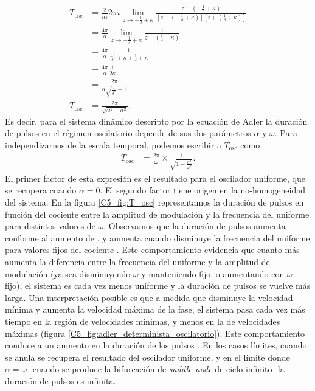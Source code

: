 \documentclass[./main.tex]{subfiles}
\begin{document}
\begin{align}
   T_{\text{osc}} &= \frac{2}{i\alpha} 2\pi i \lim_{z \to -\frac{1}{\delta} + \kappa} \frac{z-(-\frac{1}{\delta} + \kappa)}{[z-(-\frac{1}{\delta} + \kappa)][z + (\frac{1}{\delta} + \kappa)] } \nonumber\\
    &= \frac{4\pi}{\alpha} \lim_{z \to -\frac{1}{\delta} + \kappa} \frac{1}{z + (\frac{1}{\delta} + \kappa)} \nonumber \\
     &= \frac{4\pi}{\alpha}  \frac{1}{\frac{-1}{\delta} + \kappa + \frac{1}{\delta} + \kappa} \nonumber \\
     &=\frac{4\pi}{\alpha}  \frac{1}{2 \kappa} \nonumber\\
     &= \frac{2\pi}{\alpha \sqrt{\frac{1}{\delta^{2}} + 1}} \nonumber \\
       T_{\text{osc}} &= \frac{2\pi}{\sqrt{\omega^{2}-\alpha^{2}}}.
      \label{C5_eq:T_osc}
\end{align}
Es decir, para el sistema dinámico descripto por la ecuación de Adler la duración de pulsos en el régimen oscilatorio depende de sus dos parámetros $\alpha$ y $\omega$. Para independizarnos de la escala temporal, podemos escribir a $T_{\text{osc}}$ como
\begin{align}
    T_{\text{osc}} &= \frac{2\pi}{\omega} \times \frac{1}{\sqrt{1-\frac{\alpha^{2}}{\omega^{2}}}}.
\end{align}
El primer factor de esta expresión es el resultado para el oscilador uniforme, que se recupera cuando $\alpha = 0$. El segundo factor tiene origen en la no-homogeneidad del sistema. En la figura \ref{C5_fig:T_osc} representamos la duración de pulsos en función del cociente entre la amplitud de modulación y la frecuencia del uniforme \dddelta para distintos valores de $\omega$. Observamos que la duración de pulsos aumenta conforme al aumento de \dddelta, y aumenta cuando disminuye la frecuencia del uniforme para valores fijos del cociente \dddelta. Este comportamiento evidencia que cuanto más aumenta la diferencia entre la frecuencia del uniforme y la amplitud de modulación (ya sea disminuyendo $\omega$ y manteniendo \dddelta fijo, o aumentando \dddelta con $\omega$ fijo), el sistema es cada vez menos uniforme y la duración de pulsos se vuelve más larga. Una interpretación posible es que a medida que disminuye la velocidad mínima y aumenta la velocidad máxima de la fase, el sistema pasa cada vez más tiempo en la región de velocidades mínimas, y menos en la de velocidades máximas (figura \ref{C5_fig:adler_determinista_oscilatorio}). Este comportamiento conduce a un aumento en la duración de los pulsos \cite{Strogatz1994}. En los casos límites, cuando \dddelta se anula se recupera el resultado del oscilador uniforme, y en el límite donde $\alpha = \omega$ -cuando se produce la bifurcación de \textit{saddle-node} de ciclo infinito- la duración de pulsos es infinita. %
\end{document}
